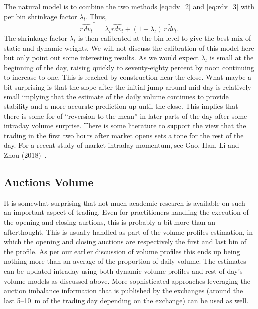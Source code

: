 The natural  model is to combine the two methods \eqref{eq:rdv_2} and \eqref{eq:rdv_3} with per bin shrinkage factor $\lambda_t$. Thus,
	\begin{equation}\label{eq:rdv_4}
	\widehat{r\,dv_t}^* = \lambda_t \widehat{rdv_t} + (1-\lambda_t)\, \widetilde{r\, dv_t}.
	\end{equation}
The shrinkage factor $\lambda_t$ is then calibrated at the bin level to give the best mix of static and dynamic weights. We will not discuss the calibration of this model here but only point out some interesting results. As we would expect $\lambda_t$ is small at the beginning of the day, raising quickly to seventy-eighty percent by noon continuing to increase to one. This is reached by construction near the close. What maybe a bit surprising is that the slope after the initial jump around mid-day is relatively small implying that the estimate of the daily volume continues to provide stability and a more accurate prediction up until the close. This implies that there is some for of ``reversion to the mean'' in later parts of the day after some intraday volume surprise. There is some literature to support the view that the trading in the first two hours after market opens sets a tone for the rest of the day. For a recent study of market intraday momentum, see Gao, Han, Li and Zhou (2018)~\cite{ghliz}.



\subsection{Auctions Volume\label{sec:auction_volume}} \label{in:close4}

It is somewhat surprising that not much academic research is available on such an important aspect of trading. Even for practitioners handling the execution of the opening and closing auctions, this is probably a bit more than an afterthought. This is usually handled as part of the volume profiles estimation, in which the opening and closing auctions are respectively the first and last bin of the profile. As per our earlier discussion of volume profiles this ends up being nothing more than an average of the proportion of daily volume. The estimates can be updated  intraday using both dynamic volume profiles and rest of day's volume models as discussed above. More sophisticated approaches leveraging the auction imbalance information that is published by the exchanges (around the last 5--10~m of the trading day depending on the exchange) can be used as well.


